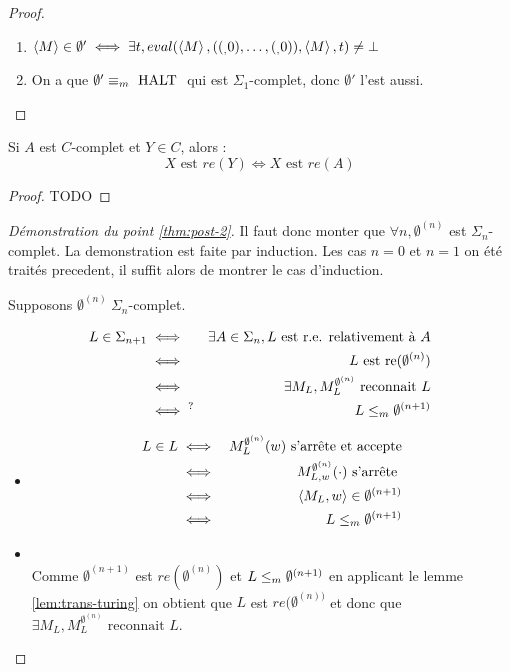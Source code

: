 \begin{proof}
	\begin{enumerate}
		\item $\left\langle M\right\rangle \in \emptyset' \iff \exists t, eval (\left\langle M\right\rangle, ((_,0), \ldots, (_,0)), \left\langle M\right\rangle, t) \neq \bot$
		\item On a que $\emptyset' \equiv_m \text{ HALT }$ qui est $\Sigma_1$-complet, donc $\emptyset'$ l'est aussi.
	\end{enumerate}
\end{proof}


\begin{lemma} \label{lem:trans-turing}
	Si $A$ est $C$-complet et $Y \in C$, alors :
	$$X \text{ est } re(Y) \iff X \text{ est } re(A)$$
\end{lemma}

\begin{proof}
	TODO
\end{proof}


\begin{proof}[Démonstration du point \ref{thm:post-2}]
	Il faut donc monter que $\forall n, \emptyset^{(n)}$ est $\Sigma_n$-complet.
	La demonstration est faite par induction. Les cas $n =0$ et $n=1$ on été traités precedent, il suffit alors de montrer le cas d'induction.

	Supposons $\emptyset^{(n)} \ \Sigma_n$-complet.

	\begin{eqnarray*}
		L \in \Sigma_{n+1} &\iff& \exists A \in \Sigma_n, L \text { est r.e. relativement à } A \\
		&\iff& L \text{ est re}(\emptyset^{(n)})\\
		&\iff& \exists M_L, M_L^{\emptyset^{(n)}} \text { reconnait } L \\
		&\iff^? & L \leq_m \emptyset^{(n + 1)}
	\end{eqnarray*}

	\begin{itemize}
		\item \bimpLR
		      \begin{eqnarray*}
			      L \in  L  &\iff&  M_L^{\emptyset^{(n)}}(w) \text{ s'arrête et accepte} \\
			      &\iff&  M_{L,w}^{\emptyset^{(n)}}(\cdot) \text{ s'arrête } \\
			      &\iff&  \left\langle M_L,w\right\rangle \in \emptyset^{(n+1)} \\
			      &\iff&  L \leq_m  \emptyset^{(n+1)}
		      \end{eqnarray*}
		\item \bimpRL \\
		      Comme $\emptyset^{(n+1)}$ est $re(\emptyset^{(n)})$ et $L \leq_m \emptyset^{(n+1)}$ en applicant le lemme \ref{lem:trans-turing}
		      on obtient que $L$ est $re(\emptyset^{(n))}$ et donc que $\exists M_L, M_L^{\emptyset^{(n)}} \text { reconnait } L$.
	\end{itemize}
\end{proof}


